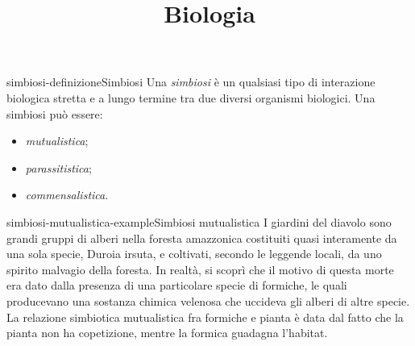 \documentclass[preview]{standalone}
\begin{document}
\title{Biologia}
\genpage

\begin{snippetdefinition}{simbiosi-definizione}{Simbiosi}
    Una \textit{simbiosi} è un qualsiasi tipo di interazione biologica stretta
    e a lungo termine tra due diversi organismi biologici.
    Una simbiosi può essere:
    \begin{itemize}
        \item \textit{mutualistica};
        \item \textit{parassitistica};
        \item \textit{commensalistica}.
    \end{itemize}
\end{snippetdefinition}

\begin{snippetexample}{simbiosi-mutualistica-example}{Simbiosi mutualistica}
    I giardini del diavolo sono grandi gruppi di alberi nella foresta amazzonica
    costituiti quasi interamente da una sola specie, Duroia
    irsuta, e coltivati, secondo le leggende locali, da uno spirito
    malvagio della foresta.
    In realtà, si scoprì che il motivo di questa morte era dato dalla presenza
    di una particolare specie di formiche, le quali producevano una sostanza
    chimica velenosa che uccideva gli alberi di altre specie.
    La relazione simbiotica mutualistica fra formiche e pianta è data dal fatto che
    la pianta non ha copetizione, mentre la formica guadagna l'habitat.  
\end{snippetexample}
\end{document}
